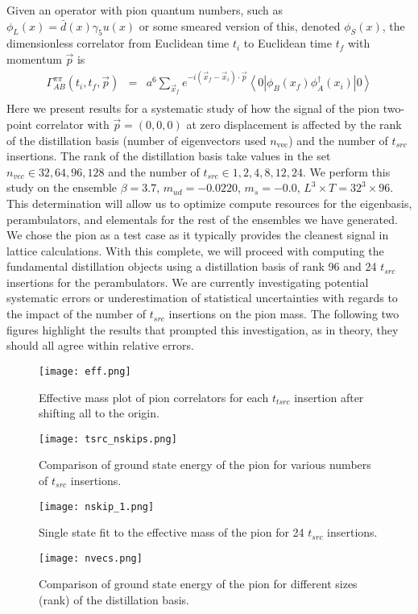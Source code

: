 Given an operator with pion quantum numbers, such as $\phi_L(x) = \bar{d}(x)\gamma_5u(x)$ or some smeared version of this, denoted $\phi_S(x)$, the dimensionless correlator from Euclidean time $t_i$ to Euclidean time $t_f$ with momentum $\vec p$ is
\begin{eqnarray}
\Gamma^{\pi\pi}_{AB}(t_i,t_f,\vec{p})
 &=& a^6\sum_{{\vec x}_f}e^{-i(\vec{x}_f-\vec{x}_i)\cdot\vec{p}}
     \left<0\left|\phi_B(x_f)\phi_A^\dagger(x_i)\right|0\right> \nonumber \\
\end{eqnarray}
Here we present results for a systematic study of how the signal of the pion two-point correlator with $\vec{p}=(0,0,0)$ at zero displacement is affected by the rank of the distillation basis (number of eigenvectors used $n_{\text{vec}}$) and the number of $t_{src}$ insertions. The rank of the distillation basis take values in the set $n_{vec}\in {32,64,96,128}$ and the number of $t_{src} \in {1,2,4,8,12,24}$. We perform this study on the ensemble $\beta = 3.7$, $m_{ud}=-0.0220$, $m_s = -0.0$, $L^3 \times T = 32^3\times96$. This determination will allow us to optimize compute resources for the eigenbasis, perambulators, and elementals for the rest of the ensembles we have generated. We chose the pion as a test case as it typically provides the cleanest signal in lattice calculations. With this complete, we will proceed with computing the fundamental distillation objects using a distillation basis of rank 96 and 24 $t_{src}$ insertions for the perambulators. We are currently investigating potential systematic errors or underestimation of statistical uncertainties with regards to the impact of the number of $t_{src}$ insertions on the pion mass. The following two figures highlight the results that prompted this investigation, as in theory, they should all agree within relative errors.
\begin{figure}[h]
    \centering
    \texttt{[image: eff.png]}
    \caption{Effective mass plot of pion correlators for each $t_{tsrc}$ insertion after shifting all to the origin.}
    \label{fig:figure10}
\end{figure}

\begin{figure}[h]
    \centering
    \texttt{[image: tsrc\_nskips.png]}
    \caption{Comparison of ground state energy of the pion for various numbers of $t_{src}$ insertions.}
    \label{fig:figure3}
\end{figure}

\begin{figure}[h]
    \centering
    \texttt{[image: nskip\_1.png]}
    \caption{Single state fit to the effective mass of the pion for 24 $t_{src}$ insertions.}
    \label{fig:figure4}
\end{figure}

\begin{figure}[h]
    \centering
    \texttt{[image: nvecs.png]}
    \caption{Comparison of ground state energy of the pion for different sizes (rank) of the distillation basis.}
    \label{fig:figure2}
\end{figure}


